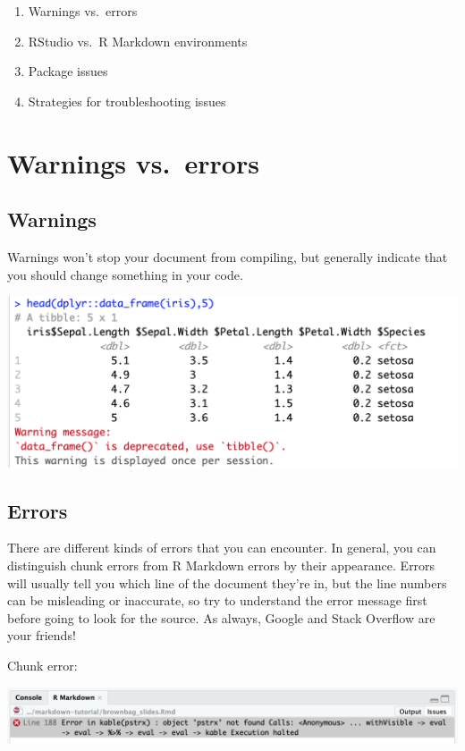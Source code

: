 \documentclass[
  openany]{book}
\providecommand{\tightlist}{%
  \setlength{\itemsep}{0pt}\setlength{\parskip}{0pt}}
\begin{document}
\begin{enumerate}
\def\labelenumi{\arabic{enumi}.}
\tightlist
\item
  Warnings vs.~errors
\item
  RStudio vs.~R Markdown environments
\item
  Package issues
\item
  Strategies for troubleshooting issues
\end{enumerate}

\hypertarget{warnings-vs.-errors}{%
\section{Warnings vs.~errors}\label{warnings-vs.-errors}}

\hypertarget{warnings}{%
\subsection{Warnings}\label{warnings}}

Warnings won't stop your document from compiling, but generally indicate that you should change something in your code.

\includegraphics[width=\textwidth]{images/warning_example}

\hypertarget{errors}{%
\subsection{Errors}\label{errors}}

There are different kinds of errors that you can encounter. In general, you can distinguish chunk errors from R Markdown errors by their appearance. Errors will usually tell you which line of the document they're in, but the line numbers can be misleading or inaccurate, so try to understand the error message first before going to look for the source. As always, Google and Stack Overflow are your friends!

Chunk error:

\includegraphics[width=\textwidth]{images/error_example}
\end{document}

